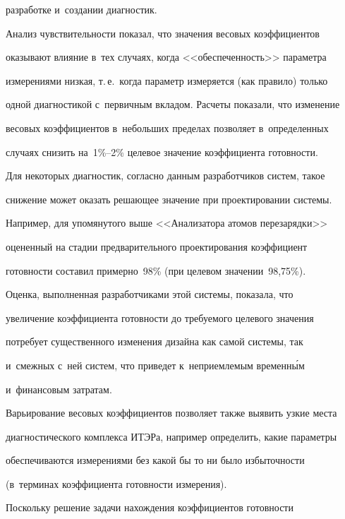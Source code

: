разработке и~создании диагностик. 





Анализ чувствительности показал, что значения весовых коэффициентов 


оказывают влияние в~тех случаях, когда <<обеспеченность>> па\-ра\-мет\-ра 


измерениями низкая, т.\,е.\ когда параметр измеряется (как правило) только 


одной диагностикой с~первичным вкладом. Расчеты показали, что изменение 


весовых коэффициентов в~небольших пределах поз\-во\-ля\-ет в~определенных 


случаях снизить на~1\%--2\% целевое значение коэффициента го\-тов\-ности. 


Для некоторых диагностик, согласно данным разработчиков сис\-тем, такое 


снижение может оказать решающее значение при проектировании сис\-те\-мы. 


Например, для упомянутого выше <<Анализатора атомов перезарядки>> 


оцененный на стадии предварительного проектирования коэффициент 


готовности со\-ста\-вил примерно~98\% (при целевом значении~98,75\%). 


Оценка, выполненная разработчиками этой сис\-те\-мы, показала, что 


увеличение коэффициента готовности до тре\-бу\-емо\-го целевого значения 


потребует существенного изменения дизайна как самой сис\-те\-мы, так 


и~смежных с~ней сис\-тем, что приведет к~неприемлемым вре\-мен\-н\'{ы}м 


и~финансовым за\-тра\-там. 





Варьирование весовых коэффициентов позволяет так\-же выявить узкие места 


диагностического комплекса ИТЭРа, например определить, какие па\-ра\-мет\-ры 


обеспечиваются измерениями без ка\-кой бы то ни было из\-бы\-точ\-ности 


(в~терминах коэффициента го\-тов\-ности измерения).





Поскольку решение задачи нахождения коэффициентов го\-тов\-ности 


